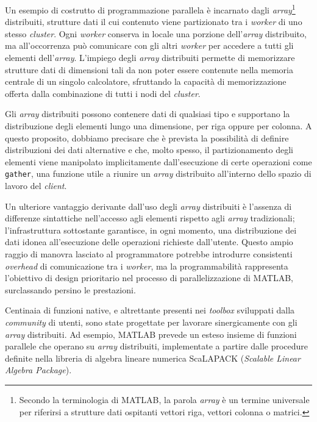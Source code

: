 Un esempio di costrutto di programmazione parallela \`e incarnato dagli \textit{array}\footnote{Secondo la terminologia di MATLAB, la parola \textit{array} \`e un termine universale per riferirsi a strutture dati ospitanti vettori riga, vettori colonna o matrici.}
distribuiti, strutture dati il cui contenuto viene partizionato tra i \textit{worker} di uno stesso \textit{cluster}. Ogni \textit{worker} conserva in locale una porzione dell'\textit{array} distribuito, ma all'occorrenza pu\`o comunicare con gli altri \textit{worker} per accedere a tutti gli elementi dell'\textit{array}.\newline
L'impiego degli \textit{array} distribuiti permette di memorizzare strutture dati di dimensioni tali da non poter essere contenute nella memoria centrale di un
singolo calcolatore, sfruttando la capacit\`a di memorizzazione offerta dalla combinazione di tutti i nodi del \textit{cluster}.

Gli \textit{array} distribuiti possono contenere dati di qualsiasi tipo e supportano la distribuzione degli elementi lungo una dimensione,
per riga oppure per colonna.\newline
A questo proposito, dobbiamo precisare che \`e prevista la possibilit\`a di definire distribuzioni dei dati alternative e che, molto spesso, il partizionamento degli elementi viene manipolato implicitamente dall'esecuzione di certe operazioni
come \lstinline{gather}, una funzione utile a riunire un \textit{array} distribuito all'interno dello spazio di lavoro del \textit{client}.

Un ulteriore vantaggio derivante dall'uso degli \textit{array} distribuiti \`e l'assenza di differenze sintattiche nell'accesso agli elementi rispetto agli \textit{array} tradizionali; l'infrastruttura sottostante garantisce, in ogni momento, una distribuzione dei dati idonea all'esecuzione delle operazioni
richieste dall'utente.\newline
Questo ampio raggio di manovra lasciato al programmatore potrebbe introdurre consistenti \textit{overhead} di comunicazione tra i \textit{worker},
ma la programmabilit\`a rappresenta l'obiettivo di design prioritario nel processo di parallelizzazione di MATLAB, surclassando persino le prestazioni.

Centinaia di funzioni native, e altrettante presenti nei \textit{toolbox} sviluppati dalla \textit{community} di utenti, sono state progettate per lavorare sinergicamente con gli \textit{array} distribuiti.\newline
Ad esempio, MATLAB prevede un esteso insieme di funzioni parallele che operano su \textit{array} distribuiti, implementate a partire dalle procedure definite nella libreria di algebra lineare numerica ScaLAPACK (\textit{Scalable Linear Algebra Package}).